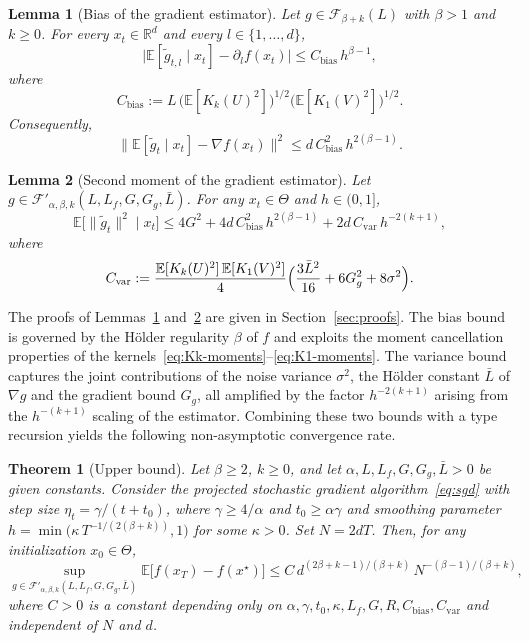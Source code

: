 \documentclass{article}
\newtheorem{theorem}{Theorem}[section]
\newtheorem{lemma}{Lemma}[section]
\renewcommand{\leq}{\leqslant}
\renewcommand{\geq}{\geqslant}
\renewcommand{\ge}{\geqslant}
\renewcommand{\hat}{\widehat}
\theoremstyle{definition}
\begin{document}
\begin{lemma}[Bias of the gradient estimator]
\label{lem:bias-multi}
Let $g\in\mathcal{F}_{\beta+k}(L)$ with $\beta>1$ and $k\geq 0$. 
For every $x_t\in\mathbb{R}^d$ and every $l\in\{1,\dots,d\}$,
\[
\bigl|\mathbb{E}[\tilde{g}_{t,l}\mid x_t]-\partial_l f(x_t)\bigr|
\leq C_{\mathrm{bias}}\,h^{\beta-1},
\]
where 
\[
C_{\mathrm{bias}}
:=L\,\bigl(\mathbb{E}[K_k(U)^2]\bigr)^{1/2}
\bigl(\mathbb{E}[K_1(V)^2]\bigr)^{1/2}.
\]
Consequently,
\[
\bigl\|\mathbb{E}[\tilde{g}_t\mid x_t]-\nabla f(x_t)\bigr\|^2
\leq d\,C_{\mathrm{bias}}^2\,h^{2(\beta-1)}.
\]
\end{lemma}

\begin{lemma}[Second moment of the gradient estimator]
\label{lem:var-multi-second-moment}
Let $g\in\mathcal{F}'_{\alpha,\beta,k}(L,L_f,G,G_g,\bar{L})$. For 
any $x_t\in\Theta$ and $h\in(0,1]$,
\[
\mathbb{E}\bigl[\|\tilde{g}_t\|^2\mid x_t\bigr]
\leq 4G^2+4d\,C_{\mathrm{bias}}^2\,h^{2(\beta-1)}
+2d\,C_{\mathrm{var}}\,h^{-2(k+1)},
\]
where 
\[
C_{\mathrm{var}}
:=\frac{\mathbb{E}[K_k(U)^2]\,\mathbb{E}[K_1(V)^2]}{4}
\Bigl(\frac{3\bar{L}^2}{16}+6G_g^2+8\sigma^2\Bigr).
\]
\end{lemma}

The proofs of Lemmas~\ref{lem:bias-multi} 
and~\ref{lem:var-multi-second-moment} are given in 
Section~\ref{sec:proofs}. The bias bound is governed by the 
H\"older regularity $\beta$ of $f$ and exploits the moment 
cancellation properties of the 
kernels~\eqref{eq:Kk-moments}--\eqref{eq:K1-moments}. The variance 
bound captures the joint contributions of the noise variance 
$\sigma^2$, the H\"older constant $\bar{L}$ of $\nabla g$ and the 
gradient bound $G_g$, all amplified by the factor $h^{-2(k+1)}$ 
arising from the $h^{-(k+1)}$ scaling of the estimator. 
Combining these two bounds with a \cite{chung1954stochastic} type recursion 
yields the following non-asymptotic convergence rate.

\begin{theorem}[Upper bound]
\label{thm:upper-bound}
Let $\beta\ge 2$, $k\geq 0$, and let $\alpha,L,L_f,G,G_g,\bar{L}>0$ 
be given constants. Consider the projected stochastic gradient 
algorithm~\eqref{eq:sgd} with step size $\eta_t=\gamma/(t+t_0)$, 
where $\gamma\geq 4/\alpha$ and $t_0\geq\alpha\gamma$ and smoothing
parameter $h=\min\bigl(\kappa\,T^{-1/(2(\beta+k))},1\bigr)$ for 
some $\kappa>0$. Set $N=2dT$. Then, for any initialization 
$x_0\in\Theta$,
\[
\sup_{g\in\mathcal{F}'_{\alpha,\beta,k}(L,L_f,G,G_g,\bar{L})}
\mathbb{E}\bigl[f(x_T)-f(x^\star)\bigr]
\leq C\,d^{(2\beta+k-1)/(\beta+k)}\,N^{-(\beta-1)/(\beta+k)},
\]
where $C>0$ is a constant depending only on 
$\alpha,\gamma,t_0,\kappa,L_f,G,R,C_{\mathrm{bias}},C_{\mathrm{var}}$ 
and independent of $N$ and $d$. %
\end{theorem}
\end{document}
